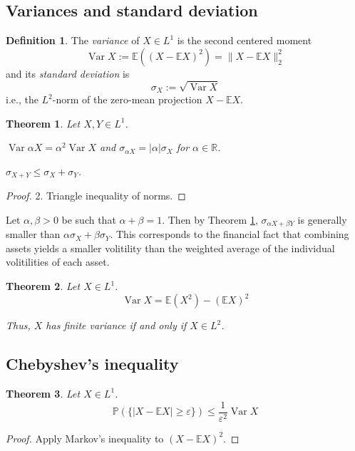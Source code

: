 \documentclass[11pt, a4paper, openany]{book}
\newtheorem{thm}{Theorem}\newtheorem{lem}{Lemma}\newtheorem{crl}{Corollary}
\theoremstyle{definition}
\newtheorem{define}{Definition}\newtheorem{exam}{Example}\newtheorem{remark}{Remark}
\DeclareMathOperator{\Var}{Var}
\newenvironment{tight_enumerate}{\begin{enumerate}\itemsep -0.2em}{\end{enumerate}}
\begin{document}
\subsection{Variances and standard deviation}
    \begin{define}
        The \textit{variance} of $X\in L^1$ is the second centered moment 
        \[
           \Var X:=\mathbb{E}((X-\mathbb{E}X)^2)=\|X-\mathbb{E}X\|_2^2
        \]
        and its \textit{standard deviation} is 
        \[
            \sigma_{X}:=\sqrt{\Var X}
        \]
        i.e., the $L^2$-norm of the zero-mean projection $X-\mathbb{E}X$.
    \end{define}
    \begin{thm}\label{properties of variances and standard deviation}
        Let $X,Y\in L^1$.
        \begin{tight_enumerate}
            \item $\Var{\alpha X}=\alpha^2\Var X$ and $\sigma_{\alpha X}=|\alpha|\sigma_{X}$ for $\alpha\in\mathbb{R}$.
            \item $\sigma_{X+Y}\leqslant \sigma_{X}+\sigma_{Y}$.
        \end{tight_enumerate}
    \end{thm}
    \begin{proof}
        2. Triangle inequality of norms.
    \end{proof}
    Let $\alpha,\beta>0$ be such that $\alpha+\beta =1$. Then by Theorem \ref{properties of variances and standard deviation}, $\sigma_{\alpha X+\beta Y}$ is generally smaller than $\alpha \sigma_X+\beta\sigma_Y$. This corresponds to the financial fact that combining assets yields a smaller volitility than the weighted average of the individual volitilities of each asset.
    \begin{thm}
        Let $X\in L^1$.
        \[
            \Var X=\mathbb{E}(X^2)-(\mathbb{E}X)^2
        \]

        Thus, $X$ has finite variance if and only if $X\in L^2$.
    \end{thm}
\subsection{Chebyshev's inequality}
    \begin{thm}
        Let $X\in L^1$.
        \[
            \mathbb{P}(\{|X-\mathbb{E}X|\geqslant\varepsilon\})\leqslant \frac{1}{\varepsilon^2}\Var{X}
        \]
    \end{thm}
    \begin{proof}
        Apply Markov's inequality to $(X-\mathbb{E}X)^2$.
    \end{proof}
\end{document}

